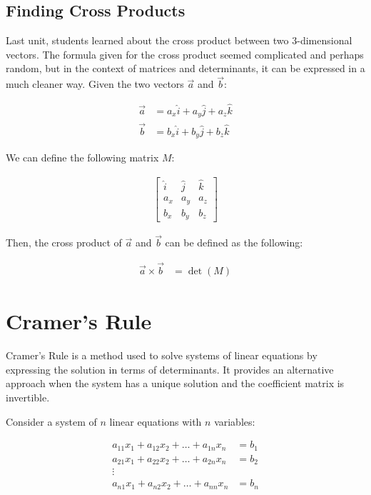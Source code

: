 \documentclass[11pt]{article}
\begin{document}
\subsection{Finding Cross Products}

Last unit, students learned about the cross product between two 3-dimensional vectors. The formula given for the cross product seemed complicated and perhaps random, but in the context of matrices and determinants, it can be expressed in a much cleaner way. Given the two vectors $\vec{a}$ and $\vec{b}$: 

\begin{align*}
    \vec{a} &= a_x \hat{i} + a_y \hat{j} + a_z \hat{k} \\
    \vec{b} &= b_x \hat{i} + b_y \hat{j} + b_z \hat{k}
\end{align*}

We can define the following matrix $M$:

\begin{align*}
    \begin{bmatrix}
    \hat{i} & \hat{j} & \hat{k} \\
    a_x & a_y & a_z \\
    b_x & b_y & b_z 
    \end{bmatrix}
\end{align*}

Then, the cross product of $\vec{a}$ and $\vec{b}$ can be defined as the following: 

\begin{align*}
    \vec{a} \times \vec{b} &= \det(M)
\end{align*}

\section{Cramer's Rule}

Cramer's Rule is a method used to solve systems of linear equations by expressing the solution in terms of determinants. It provides an alternative approach when the system has a unique solution and the coefficient matrix is invertible.

Consider a system of $n$ linear equations with $n$ variables:

\[
\begin{aligned}
a_{11}x_1 + a_{12}x_2 + \ldots + a_{1n}x_n &= b_1 \\
a_{21}x_1 + a_{22}x_2 + \ldots + a_{2n}x_n &= b_2 \\
\vdots \\
a_{n1}x_1 + a_{n2}x_2 + \ldots + a_{nn}x_n &= b_n \\
\end{aligned}
\]
\end{document}
